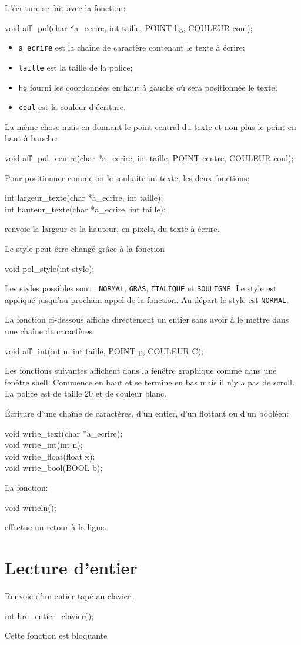 \documentclass{report}
\newcommand\code[1]{
\begin{mdframed}[linecolor=purple,backgroundcolor=blue!10]
{\tt
#1
}
\end{mdframed}
}
\begin{document}
L'écriture se fait avec la fonction:
\code{
void aff\_pol(char *a\_ecrire, int taille, POINT hg, COULEUR coul);
}
\begin{itemize}
\item \texttt{a\_ecrire} est la chaîne de caractère contenant le texte à écrire;
\item \texttt{taille} est la taille de la police;
\item \texttt{hg} fourni les coordonnées en haut à gauche où sera positionnée le texte;
\item \texttt{coul} est la couleur d'écriture.
\end{itemize}

La même chose mais en donnant le point central du texte et non plus
le point en haut à hauche:
\code{
void aff\_pol\_centre(char *a\_ecrire, int taille, POINT centre, COULEUR coul);
}

Pour positionner comme on le souhaite un texte, les deux fonctions:
\code{
int largeur\_texte(char *a\_ecrire, int taille);\\
int hauteur\_texte(char *a\_ecrire, int taille);
}
renvoie la largeur et la hauteur, en pixels, du texte à écrire.

Le style peut être changé grâce à la fonction
\code{
void pol\_style(int style);
}
Les styles possibles sont : \texttt{NORMAL}, \texttt{GRAS}, \texttt{ITALIQUE} et 
\texttt{SOULIGNE}. Le style est appliqué jusqu'au prochain appel de la fonction.
Au départ le style est \texttt{NORMAL}.

La fonction ci-dessous affiche directement un entier sans avoir 
à le mettre dans une chaîne de caractères:
\code{
void aff\_int(int n, int taille, POINT p, COULEUR C);
}

Les fonctions suivantes affichent dans la fenêtre graphique comme dans 
une fenêtre shell. Commence en haut et se termine en bas mais il n'y a
pas de scroll. La police est de taille 20 et de couleur blanc.

\'Ecriture d'une chaîne de caractères, d'un entier, d'un flottant ou d'un booléen:
\code{
void write\_text(char *a\_ecrire);\\
void write\_int(int n);\\
void write\_float(float x);\\
void write\_bool(BOOL b);
}

La fonction:
\code{
void writeln();
}
effectue un retour à la ligne.

\section{Lecture d'entier}
Renvoie d'un entier tapé au clavier. 
\code{
int lire\_entier\_clavier();
}
Cette fonction est bloquante
\end{document}
